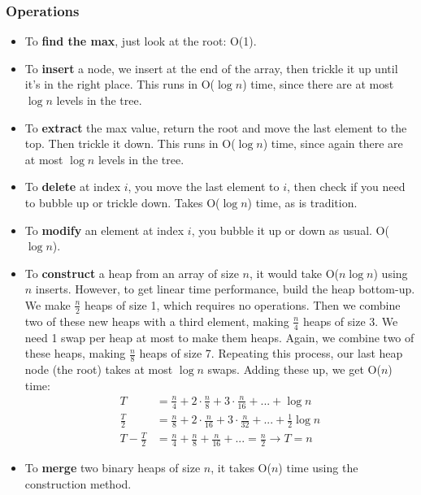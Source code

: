 \documentclass[11pt]{article}
\begin{document}
\subsubsection{Operations}
\begin{itemize}
    \item To \textbf{find the max}, just look at the root: O(1).
    \item To \textbf{insert} a node, we insert at the end of the array, then trickle it up until it's in the right place. This runs in O($\log n$) time, since there are at most $\log n$ levels in the tree.
    \item To \textbf{extract} the max value, return the root and move the last element to the top. Then trickle it down. This runs in O($\log n$) time, since again there are at most $\log n$ levels in the tree.
    \item To \textbf{delete} at index $i$, you move the last element to $i$, then check if you need to bubble up or trickle down. Takes O($\log n$) time, as is tradition.
    \item To \textbf{modify} an element at index $i$, you bubble it up or down as usual. O($\log n$).
    \item To \textbf{construct} a heap from an array of size $n$, it would take O($n\log n$) using $n$ inserts. However, to get linear time performance, build the heap bottom-up. We make $\frac{n}{2}$ heaps of size 1, which requires no operations. Then we combine two of these new heaps with a third element, making $\frac{n}{4}$ heaps of size 3. We need 1 swap per heap at most to make them heaps. Again, we combine two of these heaps, making $\frac{n}{8}$ heaps of size 7. Repeating this process, our last heap node (the root) takes at most $\log n$ swaps. Adding these up, we get O($n$) time:
    \begin{align*}
        T &= \frac{n}{4} + 2 \cdot \frac{n}{8} + 3 \cdot \frac{n}{16} + ... + \log n  \\
        \frac{T}{2} &= \frac{n}{8} + 2\cdot \frac{n}{16} + 3\cdot \frac{n}{32} + ... + \frac{1}{2} \log n \\
        T - \frac{T}{2} &=\frac{n}{4} + \frac{n}{8} + \frac{n}{16} + ... = \frac{n}{2} \rightarrow T = n
    \end{align*}
    \item To \textbf{merge} two binary heaps of size $n$, it takes O($n$) time using the construction method.
\end{itemize}
\end{document}
